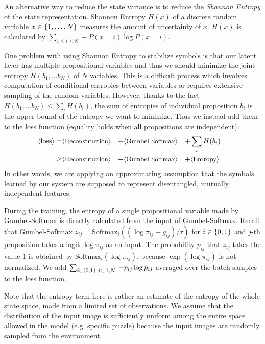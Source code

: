 An alternative way to reduce the state variance is to reduce the
\emph{Shannon Entropy} of the state representation.
Shannon Entropy $H(x)$ of a discrete random variable $x\in {\left\{1,\ldots,N\right\}}$
measures the amount of uncertainty of $x$.
% 
$H(x)$ is calculated by $\sum_{1\leq i \leq N} -P(x=i)\log P(x=i)$.
 
One problem with using Shannon Entropy to stabilize symbols is that
our latent layer has multiple propositional variables
and thus we should minimize the joint entropy $H(b_1,\ldots b_N)$ of $N$ variables.
This is a difficult process which involves
computation of conditional entropies between variables
or requires extensive sampling of the random variables.
However, thanks to the fact $H(b_1,\ldots b_N) \leq \sum_{i} H(b_i)$,
the sum of entropies of individual proposition $b_i$ is the upper bound of the entropy we want to minimize.
Thus we instead add them to the loss function (equality holds when all propositions are independent):
\begin{align*}
 \brackets{\text{loss}} =    & \brackets{\text{\small Reconstruction}} &+ & \brackets{\text{\small Gumbel Softmax}} &+ & \sum_{i} H(b_i)& \\
                        \geq & \brackets{\text{\small Reconstruction}} &+ & \brackets{\text{\small Gumbel Softmax}} &+ & \brackets{\text{\small Entropy}}
\end{align*}
In other words, we are applying an approximating assumption that the symbols learned by our system are supposed to represent
disentangled, mutually independent features.

During the training, the entropy of a single propositional variable made by Gumbel-Softmax
 is directly calculated from the input of Gumbel-Softmax.
Recall that Gumbel-Softmax $z_{ij} = \text{Softmax}_i((\log \pi_{ij} + g_{ij})/\tau)$ for $i\in{\left\{0,1\right\}}$
and $j$-th proposition takes a logit $\log \pi_{ij}$ as an input.
The probability $p_{ij}$ that $z_{ij}$ takes the value 1 is obtained by $\text{Softmax}_i(\log \pi_{ij})$,
because $\exp (\log \pi_{ij})$ is not normalized.
We add $\sum_{i\in{\left\{0,1\right\}}, j\in [1,N]} -p_{ij}\log p_{ij} $ averaged over the batch samples to the loss function.

Note that the entropy term here is rather an estimate of the entropy of
the whole state space, made from a limited set of observations.
We assume that the distribution of the input image is sufficiently
uniform among the entire space allowed in the model (e.g. specific
puzzle) because the input images are randomly sampled from
the environment.



